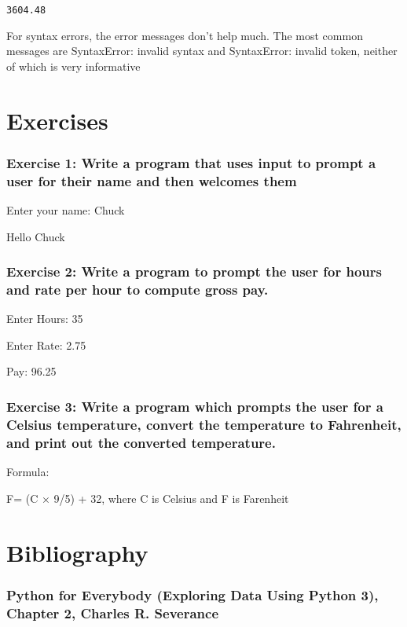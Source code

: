 \documentclass[11pt]{article}
\begin{document}
    \begin{Verbatim}[commandchars=\\\{\}]
3604.48

    \end{Verbatim}

    For syntax errors, the error messages don't help much. The most common
messages are SyntaxError: invalid syntax and SyntaxError: invalid token,
neither of which is very informative

    \section{Exercises}\label{exercises}

    \subsubsection{Exercise 1: Write a program that uses input to prompt a
user for their name and then welcomes
them}\label{exercise-1-write-a-program-that-uses-input-to-prompt-a-user-for-their-name-and-then-welcomes-them}

    Enter your name: Chuck

    Hello Chuck

    \subsubsection{Exercise 2: Write a program to prompt the user for hours
and rate per hour to compute gross
pay.}\label{exercise-2-write-a-program-to-prompt-the-user-for-hours-and-rate-per-hour-to-compute-gross-pay.}

    Enter Hours: 35

    Enter Rate: 2.75

    Pay: 96.25

    \subsubsection{Exercise 3: Write a program which prompts the user for a
Celsius temperature, convert the temperature to Fahrenheit, and print
out the converted
temperature.}\label{exercise-3-write-a-program-which-prompts-the-user-for-a-celsius-temperature-convert-the-temperature-to-fahrenheit-and-print-out-the-converted-temperature.}

    Formula:

 F= (C × 9/5) + 32, where C is Celsius and F is Farenheit

    \section{Bibliography}\label{bibliography}

    \subsubsection{ Python for Everybody (Exploring Data Using Python 3),
Chapter 2, Charles R.
Severance}\label{python-for-everybody-exploring-data-using-python-3-chapter-2-charles-r.-severance}


    
    
    
    
\end{document}
